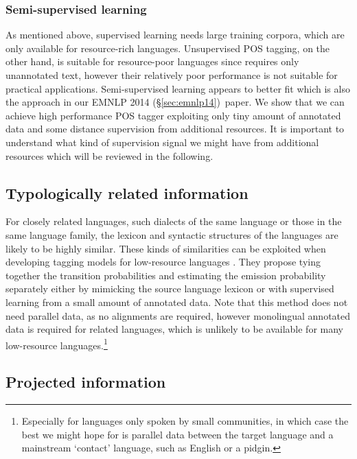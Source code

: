\documentclass[12pt,twoside,final,hidelinks]{ltthesis}
\theoremstyle{definition}
\newcommand\emnlpiv{EMNLP 2014 (\S\ref{sec:emnlp14})}
\begin{document}
\subsubsection{Semi-supervised learning}
As mentioned above, supervised learning needs large training corpora, 
which are only available for resource-rich languages. Unsupervised POS tagging, on the other hand, is suitable for resource-poor languages since requires only unannotated text, however their relatively poor performance is not suitable for practical applications. 
Semi-supervised learning appears to better fit which is also the approach in our \emnlpiv\ paper. We show that we can achieve high performance POS tagger exploiting only tiny amount of annotated data and some distance supervision from additional resources. It is important to understand what kind of supervision signal we might have from additional resources which will be reviewed in the following.
\subsection{Typologically related information}

For closely related languages, such dialects of the same language or those in the same language family, the lexicon and syntactic structures of the languages are likely to be highly similar. These kinds of similarities can be exploited when developing tagging models for low-resource languages \cite{Hana04,Feldman06,reddy2011crosspos}. They propose tying together the transition probabilities and estimating the emission probability separately either by mimicking the source language lexicon or with supervised learning from a small amount of annotated data. Note that this method does not need parallel data, as no alignments are required, however monolingual annotated data is required for related languages, which is unlikely to be available for many low-resource languages.\footnote{Especially for languages only spoken by small communities, in which case the best we might hope for is parallel data between the target language and a mainstream `contact' language, such as English or a pidgin.}  

\subsection{Projected information}
\end{document}
